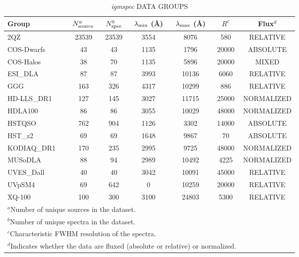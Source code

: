 \clearpage
\begin{table}[ht]
\caption{{\it igmspec} DATA GROUPS \label{tab:datasets}}
\begin{tabular}{lcccccc}
Group & $N_{\rm source}^a$ 
& $N_{\rm spec}^b$ & $\lambda_{\rm min}$ (\AA) 
& $\lambda_{\rm max}$ (\AA) & $R^c$  & Flux$^d$\\ 
\hline 
2QZ& 23539& 23539& 3554& 8076& 580& RELATIVE\\ 
COS-Dwarfs& 43& 43& 1135& 1796& 20000& ABSOLUTE\\ 
COS-Halos& 38& 70& 1135& 5896& 20000& MIXED\\ 
ESI\_DLA& 87& 87& 3993& 10136& 6060& RELATIVE\\ 
GGG& 163& 326& 4317& 10299& 886& RELATIVE\\ 
HD-LLS\_DR1& 127& 145& 3027& 11715& 25000& NORMALIZED\\ 
HDLA100& 86& 86& 3055& 10029& 48000& NORMALIZED\\ 
HSTQSO& 762& 904& 1126& 3302& 14000& ABSOLUTE\\ 
HST\_z2& 69& 69& 1648& 9867& 70& ABSOLUTE\\ 
KODIAQ\_DR1& 170& 235& 2995& 9725& 48000& NORMALIZED\\ 
MUSoDLA& 88& 94& 2989& 10492& 4225& NORMALIZED\\ 
UVES\_Dall& 40& 40& 3042& 10091& 45000& RELATIVE\\ 
UVpSM4& 69& 642& 0& 10259& 20000& RELATIVE\\ 
XQ-100& 100& 300& 3100& 24803& 5300& RELATIVE\\ 
\hline 
\multicolumn{6}{l}{{$^a$}{Number of unique sources in the dataset. }} \\ 
\multicolumn{6}{l}{{$^b$}{Number of unique spectra in the dataset. }} \\ 
\multicolumn{6}{l}{{$^c$}{Characteristic FWHM resolution of the spectra. }} \\ 
\multicolumn{6}{l}{{$^d$}{Indicates whether the data are fluxed (absolute or relative) or normalized.}} \\ 
\end{tabular} 
\end{table} 
